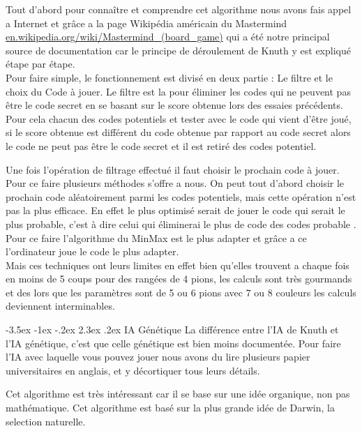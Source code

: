 \documentclass[11pt, a4paper]{article}
\makeatletter
\renewcommand{\subsection}{\@startsection{subsection}{1}{\z@}%
          {-3.5ex \@plus -1ex \@minus -.2ex}%
          {2.3ex \@plus .2ex}%
          {\reset@font\large\bfseries}}
\makeatother
\begin{document}
 \vspace{3  mm}

Tout d’abord pour connaître et comprendre cet algorithme nous avons fais appel a Internet et grâce a 
la page Wikipédia américain du Mastermind \url{en.wikipedia.org/wiki/Mastermind_(board_game)} qui a été notre principal source de documentation car le principe de 
déroulement de Knuth y est expliqué étape par étape.\\
Pour faire simple, le fonctionnement est divisé en deux partie : Le filtre et le choix du Code à jouer. 
Le filtre est la pour éliminer les codes qui ne peuvent pas être le code secret en se basant sur le score obtenue lors des essaies précédents. 
Pour cela chacun des codes potentiels et tester avec le code qui vient d’être joué,
si le score obtenue est différent du code obtenue par rapport au code secret alors le code ne peut pas être le code secret et il est retiré des codes potentiel.

\vspace{3  mm}

Une fois l’opération de filtrage effectué il faut choisir le prochain code à jouer. Pour ce faire plusieurs méthodes s’offre a nous. 
On peut tout d’abord choisir le prochain code aléatoirement parmi les codes potentiels, mais cette opération n’est pas la plus efficace. 
En effet le plus optimisé serait de jouer le code qui serait le plus probable, c’est à dire celui qui éliminerai le plus de code des codes probable .
 Pour ce faire l’algorithme du MinMax est le plus adapter et grâce a ce l’ordinateur joue le code le plus adapter. \\
Mais ces techniques ont leurs limites en effet bien qu’elles trouvent a chaque fois en moins de 5 coups pour des rangées de 4 pions, 
les calculs sont très gourmands et des lors que les paramètres sont de 5 ou 6 pions avec 7 ou 8 couleurs les calculs deviennent interminables.

\subsection{IA Génétique}
La différence entre l'IA de Knuth et l'IA génétique, c'est que celle génétique est bien moins documentée. 
Pour faire l'IA avec laquelle vous pouvez jouer nous avons du lire plusieurs papier universitaires en anglais, et y décortiquer tous leurs détails.

\vspace{3  mm}

Cet algorithme est très intéressant car il se base sur une idée organique, non pas mathématique. Cet algorithme est basé sur la plus grande idée de Darwin, la selection naturelle.
\end{document}
